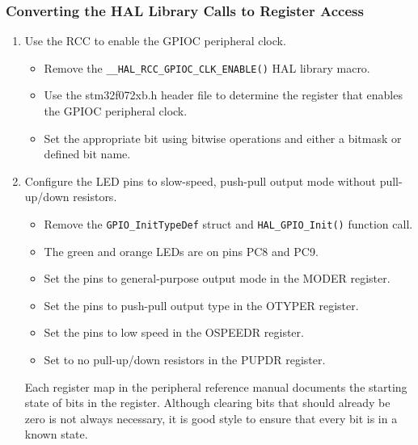 \documentclass[11pt,fleqn]{book} %
\begin{document}
\subsubsection{Converting the HAL Library Calls to Register Access}
\begin{enumerate}
    
    \item Use the RCC to enable the GPIOC peripheral clock.
    \begin{itemize}
        \item Remove the \texttt{\_\_HAL\_RCC\_GPIOC\_CLK\_ENABLE()} HAL library macro.
        \item Use the stm32f072xb.h header file to determine the register that enables the GPIOC peripheral clock.
        \item Set the appropriate bit using bitwise operations and either a bitmask or defined bit name. 
    \end{itemize}
    \item Configure the LED pins to slow-speed, push-pull output mode without pull-up/down resistors.
    \begin{itemize}
        \item Remove the \texttt{GPIO\_InitTypeDef} struct and \texttt{HAL\_GPIO\_Init()} function call.
        \item The green and orange LEDs are on pins PC8 and PC9.
        \item Set the pins to general-purpose output mode in the MODER register. 
        \item Set the pins to push-pull output type in the OTYPER register.
        \item Set the pins to low speed in the OSPEEDR register. 
        \item Set to no pull-up/down resistors in the PUPDR register. 
    \end{itemize}

    Each register map in the peripheral reference manual documents the starting state of bits in the register. Although clearing bits that should already be zero is not always necessary, it is good style to ensure that every bit is in a known state.  
    \medskip


\end{enumerate}
\end{document}
